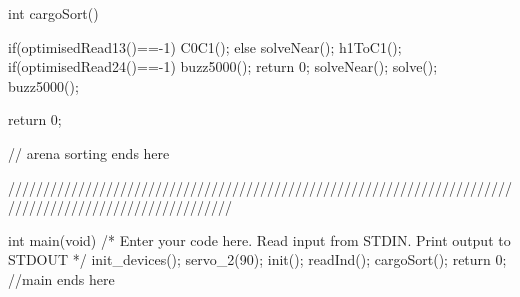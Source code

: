 int cargoSort()
{
    if(optimisedRead13()==-1)
	{
		C0C1();
	}
	else
	{
		solveNear();
		h1ToC1();
    }
	if(optimisedRead24()==-1)
	{
		buzz5000();
		return 0;
	}
    solveNear();
    solve();
    buzz5000();
	
	return 0;
}

// arena sorting ends here


////////////////////////////////////////////////////////////////////////////////////////////////////////



int main(void)
{
    /* Enter your code here. Read input from STDIN. Print output to STDOUT */
    init_devices();
	servo_2(90);
	init();
    readInd();
    cargoSort();
    return 0;
} //main ends here